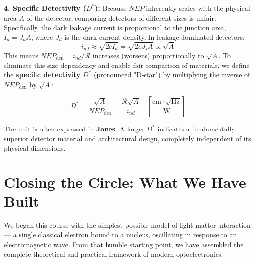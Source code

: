 \textbf{4. Specific Detectivity ($D^*$):} Because $NEP$ inherently scales with the physical area $A$ of the detector, comparing detectors of different sizes is unfair. Specifically, the dark leakage current is proportional to the junction area, $I_d = J_d A$, where $J_d$ is the dark current density. In leakage-dominated detectors:
\begin{equation*}
    i_{nd} \approx \sqrt{2e I_d} = \sqrt{2e J_d A} \propto \sqrt{A}
\end{equation*}
This means $NEP_{\text{den}} = i_{nd}/\mathcal{R}$ increases (worsens) proportionally to $\sqrt{A}$. To eliminate this size dependency and enable fair comparison of materials, we define the \textbf{specific detectivity} $D^*$ (pronounced "D-star") by multiplying the inverse of $NEP_{\text{den}}$ by $\sqrt{A}$:
\begin{keyresult}
    \begin{equation}
        D^* = \frac{\sqrt{A}}{NEP_{\text{den}}} = \frac{\mathcal{R}\sqrt{A}}{i_{nd}} \quad \left[\frac{\text{cm}\cdot\sqrt{\text{Hz}}}{\text{W}}\right]
    \end{equation}
\end{keyresult}
The unit is often expressed in \textbf{Jones}. A larger $D^*$ indicates a fundamentally superior detector material and architectural design, completely independent of its physical dimensions.

\section{Closing the Circle: What We Have Built}

We began this course with the simplest possible model of light-matter interaction — a single classical electron bound to a nucleus, oscillating in response to an electromagnetic wave. From that humble starting point, we have assembled the complete theoretical and practical framework of modern optoelectronics.

